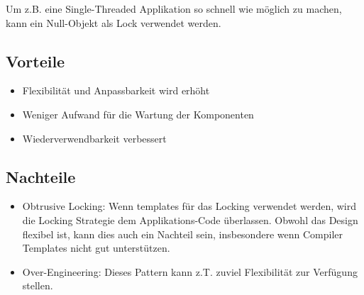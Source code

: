 Um z.B. eine Single-Threaded Applikation so schnell wie möglich zu machen, kann ein Null-Objekt als Lock verwendet werden.

\subsection*{Vorteile}

\begin{itemize}
	\item Flexibilität und Anpassbarkeit wird erhöht
	\item Weniger Aufwand für die Wartung der Komponenten
	\item Wiederverwendbarkeit verbessert
\end{itemize}

\subsection*{Nachteile}

\begin{itemize}
	\item Obtrusive Locking: Wenn templates für das Locking verwendet werden, wird die Locking Strategie dem Applikations-Code überlassen. Obwohl das Design flexibel ist, kann dies auch ein Nachteil sein, insbesondere wenn Compiler Templates nicht gut unterstützen.
	\item Over-Engineering: Dieses Pattern kann z.T. zuviel Flexibilität zur Verfügung stellen.
\end{itemize}

